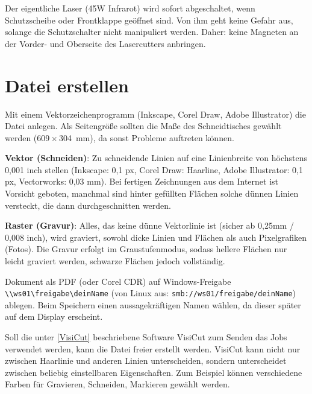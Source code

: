 \documentclass{\basedir/fablab-document}
\begin{document}
Der eigentliche Laser (45W Infrarot) wird sofort abgeschaltet, wenn Schutzscheibe oder Frontklappe geöffnet sind. Von ihm geht keine Gefahr aus, solange die Schutzschalter nicht manipuliert werden. Daher: keine Magneten an der Vorder- und Oberseite des Lasercutters anbringen.

\section{Datei erstellen}
Mit einem Vektorzeichenprogramm (Inkscape, Corel Draw, Adobe Illustrator) die Datei anlegen. Als Seitengröße sollten die Maße des Schneidtisches gewählt werden (609\,$\times$\,304~mm), da sonst Probleme auftreten können.



\textbf{Vektor (Schneiden)}: Zu schneidende Linien auf eine Linienbreite von höchstens 0,001 inch stellen (Inkscape: 0,1 px, Corel Draw: Haarline, Adobe Illustrator: 0,1 px, Vectorworks: 0,03 mm). Bei fertigen Zeichnungen aus dem Internet ist Vorsicht geboten, manchmal sind hinter gefüllten Flächen solche dünnen Linien versteckt, die dann durchgeschnitten werden. 

\textbf{Raster (Gravur)}: Alles, das keine dünne Vektorlinie ist (sicher ab 0,25mm / 0,008 inch), wird graviert, sowohl dicke Linien und Flächen als auch Pixelgrafiken (Fotos). Die Gravur erfolgt im Graustufenmodus, sodass hellere Flächen nur leicht graviert werden, schwarze Flächen jedoch vollständig. 

Dokument als PDF (oder Corel CDR) auf Windows-Freigabe \texttt{\textbackslash\textbackslash ws01\textbackslash freigabe\textbackslash deinName} (von Linux aus: \texttt{smb://ws01/freigabe/deinName}) ablegen. Beim Speichern einen aussagekräftigen Namen wählen, da dieser später auf dem Display erscheint. 

Soll die unter \ref{VisiCut} beschriebene Software VisiCut zum Senden das Jobs verwendet werden, kann die Datei freier erstellt werden.
VisiCut kann nicht nur zwischen Haarlinie und anderen Linien unterscheiden, sondern unterscheidet zwischen beliebig einstellbaren Eigenschaften. Zum Beispiel können verschiedene Farben für Gravieren, Schneiden, Markieren gewählt werden.
\end{document}
